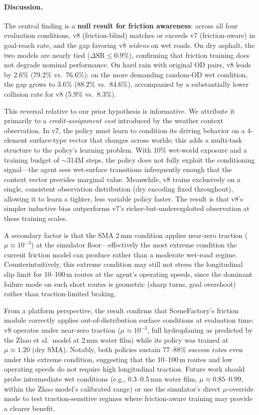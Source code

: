 \paragraph{Discussion.}
The central finding is a \textbf{null result for friction awareness}: across all four evaluation conditions, v8 (friction-blind) matches or exceeds v7 (friction-aware) in goal-reach rate, and the gap favoring v8 \emph{widens} on wet roads.
On dry asphalt, the two models are nearly tied ($\Delta\text{SR} \leq 0.9\%$), confirming that friction training does not degrade nominal performance.
On hard rain with original OD pairs, v8 leads by 2.6\% (79.2\% vs.\ 76.6\%); on the more demanding random-OD wet condition, the gap grows to 3.6\% (88.2\% vs.\ 84.6\%), accompanied by a substantially lower collision rate for v8 (5.9\% vs.\ 8.3\%).

This reversal relative to our prior hypothesis is informative.
We attribute it primarily to a \emph{credit-assignment cost} introduced by the weather context observation.
In v7, the policy must learn to condition its driving behavior on a 4-element surface-type vector that changes across worlds; this adds a multi-task structure to the policy's learning problem.
With 10\% wet-world exposure and a training budget of $\sim$314M steps, the policy does not fully exploit the conditioning signal---the agent sees wet-surface transitions infrequently enough that the context vector provides marginal value.
Meanwhile, v8 trains exclusively on a single, consistent observation distribution (dry encoding fixed throughout), allowing it to learn a tighter, less variable policy faster.
The result is that v8's simpler inductive bias outperforms v7's richer-but-underexploited observation at these training scales.

A secondary factor is that the SMA 2\,mm condition applies near-zero traction ($\mu \approx 10^{-3}$) at the simulator floor---effectively the most extreme condition the current friction model can produce rather than a moderate wet-road regime.
        Counterintuitively, this extreme condition may still not stress the longitudinal slip limit for 10--100\,m routes at the agent's operating speeds, since the dominant failure mode on such short routes is geometric (sharp turns, goal overshoot) rather than traction-limited braking.

From a platform perspective, the result confirms that SceneFactory's friction module correctly applies out-of-distribution surface conditions at evaluation time: v8 operates under near-zero traction ($\mu \approx 10^{-3}$, full hydroplaning as predicted by the Zhao et al.\ model at 2\,mm water film) while its policy was trained at $\mu \approx 1.20$ (dry SMA).
        Notably, both policies sustain 77--88\% success rates even under this extreme condition, suggesting that the 10--100\,m routes and low operating speeds do not require high longitudinal traction.
        Future work should probe intermediate wet conditions (e.g., 0.3--0.5\,mm water film, $\mu \approx 0.85$--$0.99$, within the Zhao model's calibrated range) or use the simulator's direct $\mu$-override mode to test traction-sensitive regimes where friction-aware training may provide a clearer benefit.

